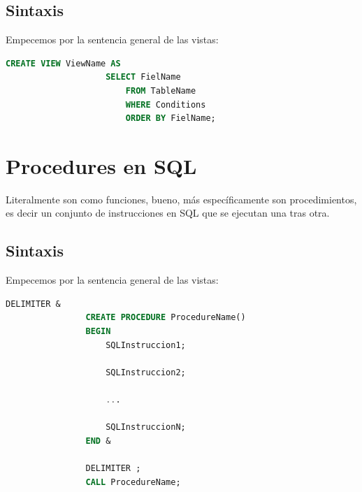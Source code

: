 \documentclass[12pt, fleqn]{report}                             %
\begin{document}
        \section{Sintaxis}

            Empecemos por la sentencia general de las vistas:

            \begin{lstlisting}[language=SQL, gobble=16]
                CREATE VIEW ViewName AS
                    SELECT FielName
                        FROM TableName
                        WHERE Conditions
                        ORDER BY FielName; 
            \end{lstlisting}

    \clearpage
    \chapter{Procedures en SQL}

        Literalmente son como funciones, bueno, más específicamente son procedimientos,
        es decir un conjunto de instrucciones en SQL que se ejecutan una tras otra.


        \section{Sintaxis}

            Empecemos por la sentencia general de las vistas:

            \begin{lstlisting}[language=SQL, gobble=16]
                DELIMITER &
                CREATE PROCEDURE ProcedureName()
                BEGIN
                    SQLInstruccion1;

                    SQLInstruccion2;

                    ...

                    SQLInstruccionN;
                END &

                DELIMITER ;
                CALL ProcedureName;
            \end{lstlisting}
\end{document}
